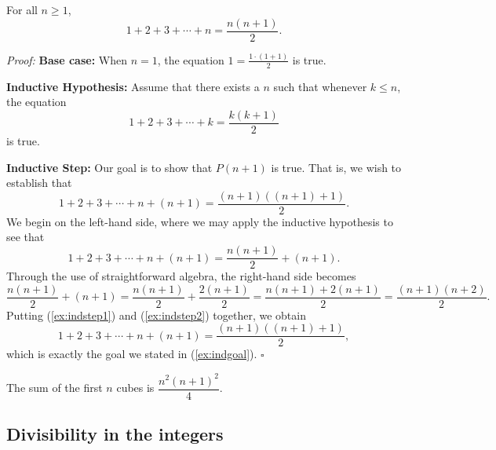 \documentclass[english,course]{lecture}
\renewcommand{\le}{\leqslant}
\renewcommand{\ge}{\geqslant}
\newenvironment{hint}{\startimportant}{}
\def\startimportant#1\end{[{Hint:} #1]\end}
\theoremstyle{plain}
\def\presnotes{}
\begin{document}
\begin{example}
	For all $n \ge 1$, 
	\[
		1+ 2 + 3 + \cdots + n = \frac{n(n+1)}{2}.
	\]
\end{example}

\noindent\emph{Proof:}
	\textbf{Base case:} When $n = 1$, the equation $1 = \frac{1\cdot (1+1)}{2}$ is true.
	
	\textbf{Inductive Hypothesis:} Assume that there exists a $n$ such that whenever $k \le n$, the equation
	\[
		1+ 2 + 3 + \cdots + k = \frac{k(k+1)}{2}
	\]
	is true.
	
	\textbf{Inductive Step:} Our goal is to show that $P(n+1)$ is true. That is, we wish to establish that
	\begin{equation}\label{ex:indgoal}
		1+ 2 + 3 + \cdots + n + (n+1) = \frac{(n+1)((n+1)+1)}{2}.
	\end{equation}
	We begin on the left-hand side, where we may apply the inductive hypothesis to see that
	\begin{equation}\label{ex:indstep1}
		1+ 2 + 3 + \cdots + n + (n+1) = \frac{n(n+1)}{2} + (n+1).
	\end{equation}
	Through the use of straightforward algebra, the right-hand side becomes 
	\begin{equation}\label{ex:indstep2}
		\frac{n(n+1)}{2} + (n+1) = \frac{n(n+1)}{2} + \frac{2(n+1)}{2} = \frac{n(n+1) + 2(n+1)}{2} = \frac{(n+1)(n+2)}{2}.
	\end{equation}
	Putting (\ref{ex:indstep1}) and (\ref{ex:indstep2}) together, we obtain
	\[
		1+ 2 + 3 + \cdots + n + (n+1) = \frac{(n+1)((n+1)+1)}{2},
	\]
	which is exactly the goal we stated in (\ref{ex:indgoal}).
\hfill $\square$

\begin{exer}
	The sum of the first $n$ cubes is $\dfrac{n^2(n+1)^2}{4}$.
\end{exer}

\presnotes


\presnotes








\subsection{Divisibility in the integers}
\end{document}
